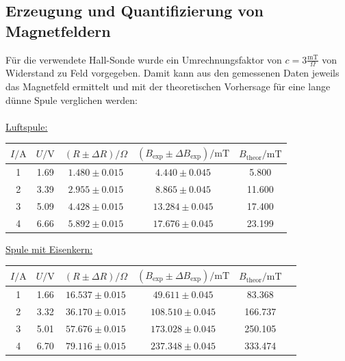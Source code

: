 \documentclass[german,  %
parskip=full,  %
]{scrartcl}
\begin{document}
\subsection{Erzeugung und Quantifizierung von Magnetfeldern}
Für die verwendete Hall-Sonde wurde ein Umrechnungsfaktor von \(c = 3 \frac{\mathrm{mT}}{\Omega}\) von Widerstand zu Feld vorgegeben. Damit kann aus den gemessenen Daten jeweils das Magnetfeld ermittelt und mit der theoretischen Vorhersage für eine lange dünne Spule verglichen werden: \\\\
\underline{\underline{Luftspule:}} 
\begin{table}[h!]
\begin{tabular}{|c|c|c|c|c|} 
\hline
\(I/ \mathrm{A}\) & \(U / \mathrm{V}\) & \((R \pm \Delta R )/ \Omega\) & \((B_{\mathrm{exp}} \pm \Delta B_{\mathrm{exp}}) / \mathrm{mT}\) & \(B_{\mathrm{theor}}  / \mathrm{mT}\)\\\hline
1 & 1.69 & \( 1.480 \pm 0.015 \) & \( 4.440 \pm 0.045 \) & 5.800 \\\hline
2 & 3.39 & \( 2.955 \pm 0.015 \) & \( 8.865 \pm 0.045 \) & 11.600 \\\hline
3 & 5.09 & \( 4.428 \pm 0.015 \) & \( 13.284 \pm 0.045 \) & 17.400 \\\hline
4 & 6.66 & \( 5.892 \pm 0.015 \) & \( 17.676 \pm 0.045 \) & 23.199 \\\hline
\end{tabular}
\end{table} 
\newpage
\underline{\underline{Spule mit Eisenkern:}} 
\begin{table}[h!]
\begin{tabular}{|c|c|c|c|c|c|} 
\hline
\(I/ \mathrm{A}\) & \(U / \mathrm{V}\) & \((R \pm \Delta R )/ \Omega\) & \((B_{\mathrm{exp}} \pm \Delta B_{\mathrm{exp}}) / \mathrm{mT}\)  & \(B_{\mathrm{theor}}  / \mathrm{mT}\) \\\hline
1 & 1.66 & \( 16.537 \pm 0.015 \) & \( 49.611 \pm 0.045 \) & 83.368 \\\hline
2 & 3.32 & \( 36.170 \pm 0.015 \) & \( 108.510 \pm 0.045 \) & 166.737 \\\hline
3 & 5.01 & \( 57.676 \pm 0.015 \) & \( 173.028 \pm 0.045 \) & 250.105 \\\hline
4 & 6.70 & \( 79.116 \pm 0.015 \) & \( 237.348 \pm 0.045 \) & 333.474 \\\hline
\end{tabular}
\end{table} \\\\
\end{document}
